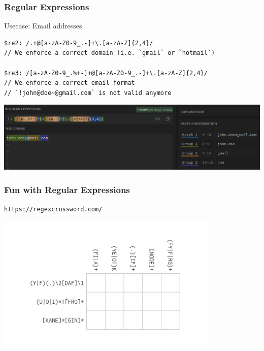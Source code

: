 \documentclass{beamer}
\begin{document}
\begin{frame}[fragile]
\frametitle{Regular Expressions}
Usecase: Email addresses
\begin{lstlisting}
$re2: /.+@[a-zA-Z0-9_.-]+\.[a-zA-Z]{2,4}/ 
// We enforce a correct domain (i.e. `gmail` or `hotmail`)

$re3: /[a-zA-Z0-9_.%+-]+@[a-zA-Z0-9_.-]+\.[a-zA-Z]{2,4}/ 
// We enforce a correct email format
// `!john@doe~@gmail.com` is not valid anymore

\end{lstlisting}

\begin{center}
\includegraphics[width=1.0\textwidth]{pics/regex101}
\end{center}
\end{frame}


\begin{frame}[fragile]
\frametitle{Fun with Regular Expressions}
\texttt{https://regexcrossword.com/}

\begin{center}
\includegraphics[width=0.8\textwidth]{pics/crosswords}
\end{center}
\end{frame}
\end{document}
